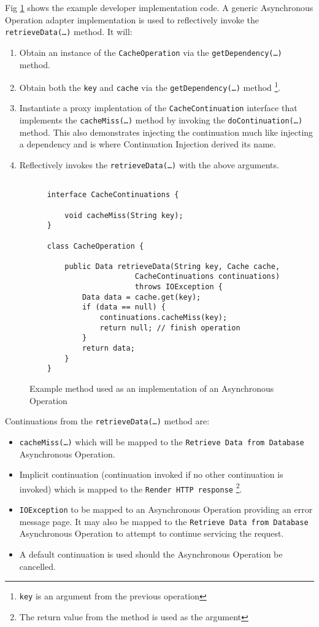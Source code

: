 \documentclass{article}
\begin{document}
Fig \ref{fig:Example_Method_Operation} shows the example developer
implementation code.  A generic Asynchronous Operation adapter implementation is
used to reflectively invoke the \texttt{retrieveData(\ldots)} method. It will:
\begin{enumerate}
  \item Obtain an instance of the \texttt{CacheOperation} via the \texttt{getDependency(\ldots)} method.
  \item Obtain both the \texttt{key} and \texttt{cache} via the \texttt{getDependency(\ldots)} method \footnote{\texttt{key} is an argument from the previous operation}.
  \item Instantiate a proxy implentation of the \texttt{CacheContinuation} interface that implements the \texttt{cacheMiss(\ldots)} method by invoking the \texttt{doContinuation(\ldots)} method.  This also demonstrates injecting the continuation much like injecting a dependency and is where Continuation Injection derived its name. 
  \item Reflectively invokes the \texttt{retrieveData(\ldots)} with the above arguments.
\end{enumerate}

\begin{figure}[!h]
\begin{verbatim}

    interface CacheContinuations {

        void cacheMiss(String key);
    }

    class CacheOperation {
    
        public Data retrieveData(String key, Cache cache, 
                        CacheContinuations continuations)
                        throws IOException {
        	Data data = cache.get(key);
        	if (data == null) {
        	    continuations.cacheMiss(key);
        	    return null; // finish operation
        	}
        	return data;
        }
    }
\end{verbatim}
\caption[Caption for Code]{Example method used as an implementation of an Asynchronous Operation}
\label{fig:Example_Method_Operation}
\end{figure}

Continuations from the \texttt{retrieveData(\ldots)} method are:
\begin{itemize}
  \item \texttt{cacheMiss(\ldots)} which will be mapped to the \texttt{Retrieve Data from Database} Asynchronous Operation.
  \item Implicit continuation (continuation invoked if no other continuation is invoked) which is mapped to the \texttt{Render HTTP response} \footnote{The return value from the method is used as the argument}.
  \item \texttt{IOException} to be mapped to an Asynchronous Operation providing an error message page.  It may also be mapped to the \texttt{Retrieve Data from Database} Asynchronous Operation to attempt to continue servicing the request.
  \item A default continuation is used should the Asynchronous Operation be cancelled.
\end{itemize}
\end{document}
